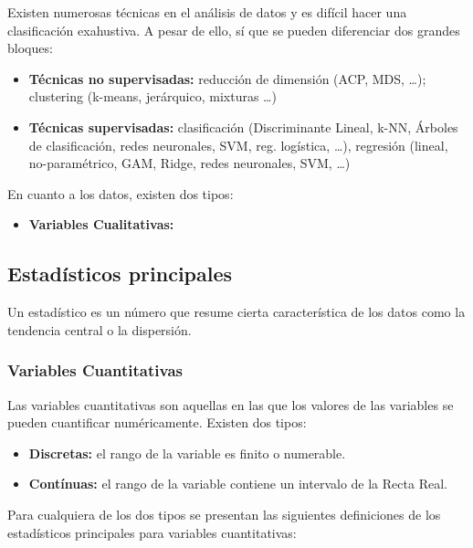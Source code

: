 Existen numerosas técnicas en el análisis de datos y es difícil hacer una clasificación exahustiva. A pesar de ello, sí que se pueden diferenciar dos grandes bloques:
\begin{itemize}
    \item \textbf{Técnicas no supervisadas:} reducción de dimensión (ACP, MDS, \dots); clustering (k-means, jerárquico, mixturas \dots)
    \item \textbf{Técnicas supervisadas:} clasificación (Discriminante Lineal, k-NN, Árboles de clasificación, redes neuronales, SVM, reg. logística, \dots),
    regresión (lineal, no-paramétrico, GAM, Ridge, redes neuronales, SVM, \dots)
\end{itemize}

En cuanto a los datos, existen dos tipos:
\begin{itemize}
    \item \textbf{Variables Cualitativas:} 
\end{itemize} 

\subsection{Estadísticos principales}
Un estadístico es un número que resume cierta característica de los datos como la tendencia central o la dispersión.

\subsubsection{Variables Cuantitativas}
Las variables cuantitativas son aquellas en las que los valores de las variables se pueden cuantificar numéricamente. Existen dos tipos:

\begin{itemize}
    \item \textbf{Discretas:} el rango de la variable es finito o numerable.
    \item \textbf{Contínuas:} el rango de la variable contiene un intervalo de la Recta Real.
\end{itemize}

Para cualquiera de los dos tipos se presentan las siguientes definiciones de los estadísticos principales para variables cuantitativas:

